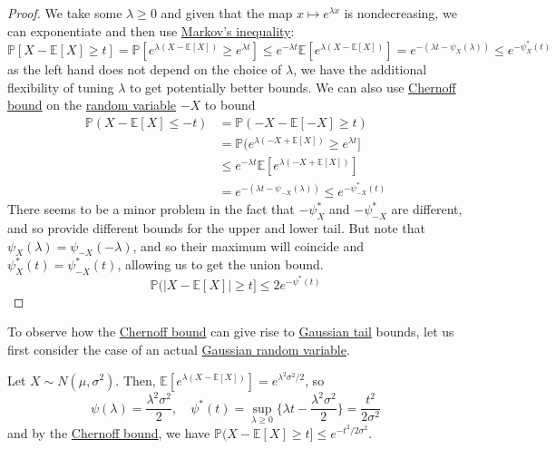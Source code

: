   \begin{proof}
  We take some $\lambda \geq 0$ and given that the map $x \mapsto e^{\lambda x}$ is nondecreasing, we can exponentiate and then use \hyperref[thm:markovs-inequality-2]{Markov's inequality}: 
  \begin{equation}
    \mathbb{P}[X - \mathbb{E}[X] \geq t ] = \mathbb{P}[ e^{\lambda(X - \mathbb{E}[X])} \geq e^{\lambda t}] \leq e^{-\lambda t} \mathbb{E}[e^{\lambda (X - \mathbb{E}[X])}] = e^{- (\lambda t - \psi_X (\lambda))} \leq e^{-\psi_X^* (t)}
  \end{equation}
  as the left hand does not depend on the choice of $\lambda$, we have the additional flexibility of tuning $\lambda$ to get potentially better bounds. We can also use \hyperref[thm:chernoff-bound]{Chernoff bound} on the \hyperref[prob-def:random-variable]{random variable} $-X$ to bound \begin{align*}
      \mathbb{P}(X - \mathbb{E}[X] \leq -t) & = \mathbb{P}(-X - \mathbb{E}[-X] \geq t) \\
      & = \mathbb{P}(e^{\lambda(-X + \mathbb{E}[X])} \geq e^{\lambda t} ] \\
      & \leq e^{-\lambda t} \mathbb{E}[ e^{\lambda (-X + \mathbb{E}[X])}] \\
      & = e^{-(\lambda t - \psi_{-X}(\lambda))} \leq e^{-\psi_{-X}^* (t)} 
  \end{align*}
  There seems to be a minor problem in the fact that $-\psi^*_X$ and $-\psi^*_{-X}$ are different, and so provide different bounds for the upper and lower tail. But note that $\psi_X (\lambda) = \psi_{-X}(-\lambda)$, and so their maximum will coincide and $\psi_X^* (t) = \psi_{-X}^* (t)$, allowing us to get the union bound. 
  \begin{equation}
    \mathbb{P}(|X - \mathbb{E}[X] | \geq t ] \leq 2e^{- \psi^* (t)}
  \end{equation}
  \end{proof}

  To observe how the \hyperref[thm:chernoff-bound]{Chernoff bound} can give rise to \hyperref[prob-thm:gaussian-tail-inequality]{Gaussian tail} bounds, let us first consider the case of an actual \hyperref[prob-def:gaussian-random-variable]{Gaussian random variable}. 

  \begin{example}
    \label{ex:the-gaussian-moment-generating-function}
  Let $X \sim N(\mu, \sigma^2)$. Then, $\mathbb{E}[ e^{\lambda (X - \mathbb{E}[X])} ] = e^{\lambda^2 \sigma^2 / 2}$, so 
  \begin{equation}
    \psi(\lambda) = \frac{\lambda^2 \sigma^2}{2}, \quad \psi^* (t) = \sup_{\lambda \geq 0} \big\{ \lambda t - \frac{\lambda^2 \sigma^2}{2} \big\} = \frac{t^2}{2 \sigma^2}
  \end{equation}
  and by the \hyperref[thm:chernoff-bound]{Chernoff bound}, we have $\mathbb{P}(X - \mathbb{E}[X] \geq t ] \leq e^{-t^2 / 2\sigma^2}$. 
  \end{example}

